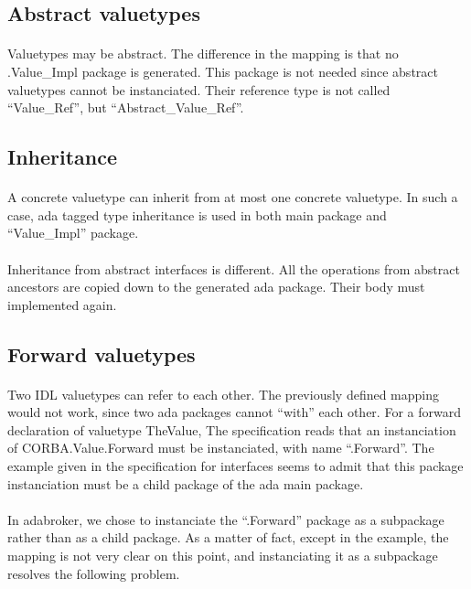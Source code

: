 \subsection{Abstract valuetypes}

\paragraph{}Valuetypes may be abstract. The difference in the mapping
is that no .Value\_Impl package is generated. This package is not
needed since abstract valuetypes cannot be instanciated. Their
reference type is not called ``Value\_Ref'', but ``Abstract\_Value\_Ref''.

\subsection{Inheritance}
\paragraph{}A concrete valuetype can inherit from at most one concrete
valuetype. In such a case, ada tagged type inheritance is used in both
main package and ``Value\_Impl'' package.

\paragraph{} Inheritance from abstract interfaces is different. All
the operations from abstract ancestors are copied down to the
generated ada package. Their body must implemented again.

\subsection{Forward valuetypes}
\paragraph{} Two IDL valuetypes can refer to each other. The
previously defined mapping would not work, since two ada packages
cannot ``with'' each other. For a forward declaration of valuetype
TheValue,
The specification reads that an
instanciation of CORBA.Value.Forward must be instanciated, with name
``.Forward''. The example given in the specification for
interfaces seems to admit that this package instanciation must be a
child package of the ada main package.

\paragraph{}In adabroker, we chose to instanciate the ``.Forward''
package as a subpackage rather than as a child package. As a matter of
fact, except in the example, the mapping is not very clear on this
point, and instanciating it as a subpackage resolves the following
problem.

